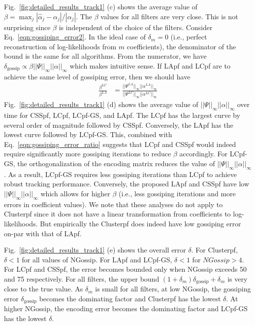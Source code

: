 \documentclass[10pt,letterpaper,final]{article}
\begin{document}
Fig.~\ref{fig:detailed_results_track1} (c) shows the average value of $\beta = \max_j|\hat{\alpha}_j-\alpha_j|/|\alpha_j|$. The $\beta$ values for all filters are very close. This is not surprising since $\beta$ is independent of the choice of the filters. Consider Eq.~\eqref{eqn:gossiping_error2}. In the ideal case of $\delta_m=0$ (i.e., perfect reconstruction of log-likelihoods from $m$ coefficients), the denominator of the bound is the same for all algorithms. From the numerator, we have $\delta_{\text{gossip}}\propto \beta||\Psi||_\infty||\alpha||_\infty$ which makes intuitive sense. If LApf and LCpf are to achieve the same level of gossiping error, then we should have
\begin{align}
\frac{\beta^{LC}}{\beta^{LA}} &= \frac{||\Psi^{LA}||_\infty||\alpha^{LA}||_\infty}{||\Psi^{LC}||_\infty||\alpha^{LC}||_\infty}
\label{eqn:gossiping_error_ratio}
\end{align}
Fig.~\ref{fig:detailed_results_track1} (d) shows the average value of $||\Psi||_\infty||\alpha||_\infty$ over time for CSSpf, LCpf, LCpf-GS, and LApf. The LCpf has the largest curve by several order of magnitude followed by CSSpf. Conversely, the LApf has the lowest curve followed by LCpf-GS. This, combined with Eq.~\eqref{eqn:gossiping_error_ratio} suggests that LCpf and CSSpf would indeed require significantly more gossiping iterations to reduce $\beta$ accordingly. For LCpf-GS, the orthogonalization of the encoding matrix reduces the value of $||\Psi||_\infty||\alpha||_\infty$. As a result, LCpf-GS requires less gossiping iterations than LCpf to achieve robust tracking performance. Conversely, the proposed LApf and CSSpf have low $||\Psi||_\infty||\alpha||_\infty$ which allows for higher $\beta$ (i.e., less gossiping iterations and more errors in coefficient values). We note that these analyses do not apply to Clusterpf since it does not have a linear transformation from coefficients to log-likelihoods. But empirically the Clusterpf does indeed have low gossiping error on-par with that of LApf. 

Fig.~\ref{fig:detailed_results_track1} (e) shows the overall error $\delta$. For Clusterpf, $\delta<1$ for all values of NGossip. For LApf and LCpf-GS, $\delta<1$ for $NGossip>4$. For LCpf and CSSpf, the error becomes bounded only when NGossip exceeds 50 and 75 respectively. For all filters, the upper bound $(1+\delta_m)\delta_{\text{gossip}}+\delta_m$ is very close to the true value. As $\delta_m$ is small for all filters, at low NGossip, the gossiping error $\delta_{\text{gossip}}$ becomes the dominating factor and Clusterpf has the lowest $\delta$. At higher NGossip, the encoding error becomes the dominating factor and LCpf-GS has the lowest $\delta$. 
\end{document}
